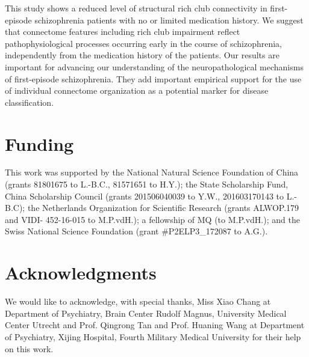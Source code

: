 \begin{refsection}
This study shows a reduced level of structural rich club connectivity in first-episode schizophrenia patients with no or limited medication history. We suggest that connectome features including rich club impairment reflect pathophysiological processes occurring early in the course of schizophrenia, independently from the medication history of the patients. Our results are important for advancing our understanding of the neuropathological mechanisms of first-episode schizophrenia. They add important empirical support for the use of individual connectome organization as a potential marker for disease classification.
    
\section*{Funding}
This work was supported by the National Natural Science Foundation of China (grants 81801675 to L.-B.C., 81571651 to H.Y.); the State Scholarship Fund, China Scholarship Council (grants 201506040039 to Y.W., 201603170143 to L.-B.C); the Netherlands Organization for Scientific Research (grants ALWOP.179 and VIDI- 452-16-015 to M.P.vdH.); a fellowship of MQ (to M.P.vdH.); and the Swiss National Science Foundation (grant \#P2ELP3\_172087 to A.G.).

\section*{Acknowledgments}
We would like to acknowledge, with special thanks, Miss Xiao Chang at Department of Psychiatry, Brain Center Rudolf Magnus, University Medical Center Utrecht and Prof. Qingrong Tan and Prof. Huaning Wang at Department of Psychiatry, Xijing Hospital, Fourth Military Medical University for their help on this work.

\printbibliography[heading=subbibliography]

\end{refsection}

